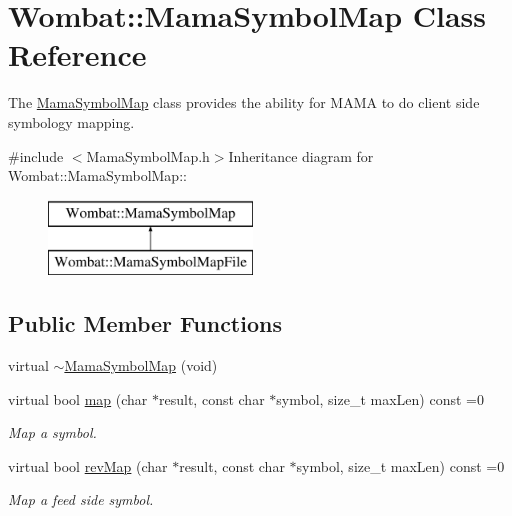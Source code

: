 \hypertarget{classWombat_1_1MamaSymbolMap}{
\section{Wombat::MamaSymbolMap Class Reference}
\label{classWombat_1_1MamaSymbolMap}
}


The \hyperlink{classWombat_1_1MamaSymbolMap}{MamaSymbolMap} class provides the ability for MAMA to do client side symbology mapping.  


{\ttfamily \#include $<$MamaSymbolMap.h$>$}Inheritance diagram for Wombat::MamaSymbolMap::\begin{figure}[H]
\begin{center}
\leavevmode
\includegraphics[height=2cm]{classWombat_1_1MamaSymbolMap}
\end{center}
\end{figure}
\subsection*{Public Member Functions}
\begin{DoxyCompactItemize}
\item 
virtual \hyperlink{classWombat_1_1MamaSymbolMap_a6305c760bf88c60104dfaf11fb39113e}{$\sim$MamaSymbolMap} (void)
\item 
virtual bool \hyperlink{classWombat_1_1MamaSymbolMap_a2e4d030ecbca9255a90c7f1d157800ef}{map} (char $\ast$result, const char $\ast$symbol, size\_\-t maxLen) const =0
\begin{DoxyCompactList}\small\item\em Map a symbol. \item\end{DoxyCompactList}\item 
virtual bool \hyperlink{classWombat_1_1MamaSymbolMap_ae6807122277f6e8fe9ac5a2a07725ccf}{revMap} (char $\ast$result, const char $\ast$symbol, size\_\-t maxLen) const =0
\begin{DoxyCompactList}\small\item\em Map a feed side symbol. \item\end{DoxyCompactList}\end{DoxyCompactItemize}


